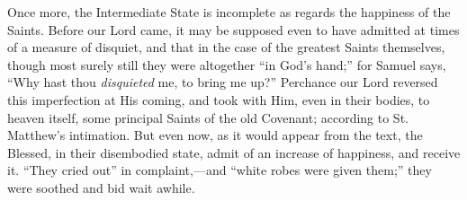 Once more, the Intermediate State is incomplete as regards the
happiness of the Saints. Before our Lord came, it may be supposed even
to have admitted at times of a measure of disquiet, and that in the
case of the greatest Saints themselves, though most surely still they
were altogether ``in God's hand;'' for Samuel says, ``Why
hast thou \emph{disquieted} me, to bring me up?'' Perchance our
Lord reversed this imperfection at His coming, and took with Him, even
in their bodies, to heaven itself, some principal Saints of the old
Covenant; according to St. Matthew's intimation. But even now, as it
would appear from the text, the Blessed, in their disembodied state,
admit of an increase of happiness, and receive it. ``They cried
out'' in complaint,—and ``white robes were given them;''
they were soothed and bid wait awhile.

